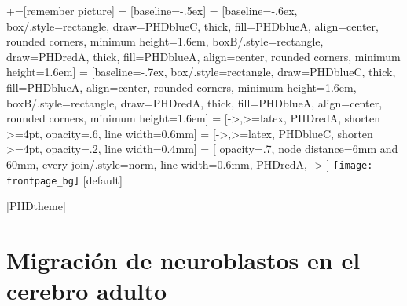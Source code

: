 +=[remember picture]
 = [baseline=-.5ex]
 = [baseline=-.6ex,
  box/.style={rectangle, draw=PHDblueC, thick, fill=PHDblueA,
    align=center, rounded corners, minimum height=1.6em},
  boxB/.style={rectangle, draw=PHDredA, thick, fill=PHDblueA,
    align=center, rounded corners, minimum height=1.6em}]
 = [baseline=-.7ex,
  box/.style={rectangle, draw=PHDblueC, thick, fill=PHDblueA,
    align=center, rounded corners, minimum height=1.6em},
  boxB/.style={rectangle, draw=PHDredA, thick, fill=PHDblueA,
    align=center, rounded corners, minimum height=1.6em}]
 = [->,>=latex, PHDredA, shorten >=4pt,
  opacity=.6, line width=0.6mm]
 = [->,>=latex, PHDblueC, shorten >=4pt, opacity=.2, line width=0.4mm]
 = [
     opacity=.7,
    node distance=6mm and 60mm, %
    every join/.style={norm},   %
    line width=0.6mm,
    PHDredA,
    ->
    ]
 {\texttt{[image: frontpage\_bg]}}
[default]







[PHDtheme]


\section{Migración de neuroblastos en el cerebro adulto}

